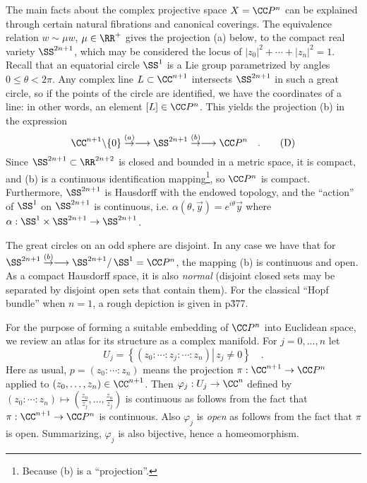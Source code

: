 The main facts about the complex projective space $X = \CC P^n$ can be explained through certain natural fibrations and canonical coverings. The equivalence relation $w \sim \mu w$, $\mu \in \RR^+$ gives the projection (a) below, to the compact real variety $\SS^{2n+1}$, which may be considered the locus of $|z_0|^2+\cdots +|z_n|^2 = 1$. Recall that an equatorial circle $\SS^1$ is a Lie group parametrized by angles $0 \leq \theta < 2 \pi$. Any complex line $L \subset \CC^{n+1}$ intersects $\SS^{2n+1}$ in such a great circle, so if the points of the circle are identified, we have the
coordinates of a line: in other words, an element $[L] \in \CC P^n$. This yields the projection (b) in the expression
$$
\CC^{n+1}\backslash\{0\}\overset{(a)}\to\longrightarrow \SS^{2n+1} \overset{(b)}\to\longrightarrow\CC P^n \quad .\tag{$\text{D}$}
$$
Since $\SS^{2n+1} \subset \RR^{2n+2}$ is closed and bounded in a metric space, it is compact, and (b) is a continuous identification mapping\footnote{Because (b) is a ``projection''.}, so $\CC P^n$ is compact. Furthermore, $\SS^{2n+1}$ is Hausdorff with the endowed topology, and the ``action'' of $\SS^1$ on $\SS^{2n+1}$ is continuous, i.e. $\alpha (\theta, \vec{y}) = e^{i\theta}\vec{y}$ where $\alpha: \SS^1 \times \SS^{2n+1} \to \SS^{2n+1}$.

The great circles on an odd sphere are disjoint. In any case we have that for $\SS^{2n+1} \overset{(b)}\to\longrightarrow \SS^{2n+1} / \,\SS^1 = \CC P^n$, the mapping (b) is continuous and open. As a compact Hausdorff space, it is also {\it normal} (disjoint closed sets may be separated by disjoint open sets that contain them). For the classical ``Hopf bundle'' when $n = 1$, a rough depiction is given in \cite{Hatcher} p\. 377.


\bigskip
For the purpose of forming a suitable embedding of $\CC P^n$ into Euclidean space, we review an atlas for its structure as a complex manifold. For $j = 0, \dotsc, n$ let
$$U_j = \left\{\left(z_0: \cdots : z_j: \cdots : z_n\right)\left| \,z_j \ne 0\right. \right\}\quad .
$$
Here as usual, $p = (z_0:\cdots : z_n)$ means the projection $\pi: \CC^{n+1} \to \CC P^n$ applied to $(z_0,\dotsc, z_n) \in \CC^{n+1}$. Then $\varphi_j: U_j \to \CC^n$ defined by $(z_0: \cdots : z_n) \mapsto \left(\frac{z_0}{z_j},\dotsc, \frac{z_n}{z_j}\right)$ is continuous as follows from the fact that $\pi: \CC^{n+1} \to \CC P^n$ is continuous. Also $\varphi_j$ is {\it open} as follows from the fact that $\pi$ is open. Summarizing, $\varphi_j$ is also bijective, hence a homeomorphism.

